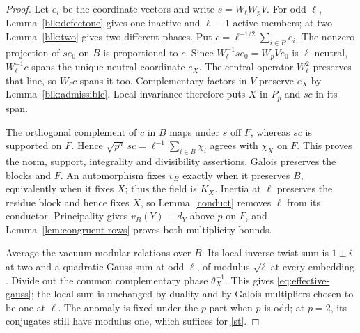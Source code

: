\documentclass[11pt]{amsart}
\numberwithin{equation}{section}
\theoremstyle{definition}
\theoremstyle{plain}
\begin{document}
\begin{proof}
Let $e_i$ be the coordinate vectors and write $s=W_\ell W_pV$.
For odd $\ell$, Lemma~\ref{blk:defectone} gives one inactive and
$\ell-1$ active members; at two Lemma~\ref{blk:two} gives two
different phases. Put $c=\ell^{-1/2}\sum_{i\in B}e_i$.
The nonzero projection of $se_0$ on $B$ is proportional to $c$.
Since $W_\ell^{-1}se_0=W_pVe_0$ is $\ell$-neutral,
$W_\ell^{-1}c$ spans the unique neutral coordinate $e_X$.
The central operator $W_\ell^2$ preserves that line, so
$W_\ell c$ spans it too. Complementary factors in $V$ preserve
$e_X$ by Lemma~\ref{blk:admissible}. Local invariance therefore
puts $X$ in $P_p$ and $sc$ in its span.

The orthogonal complement of $c$ in $B$ maps under $s$ off $F$,
whereas $sc$ is supported on $F$. Hence
$\sqrt{p^a}\,sc=\ell^{-1}\sum_{i\in B}\chi_i$ agrees with
$\chi_X$ on $F$. This proves the norm, support, integrality and
divisibility assertions. Galois preserves the blocks and $F$.
An automorphism fixes $v_B$ exactly when it preserves $B$,
equivalently when it fixes $X$; thus the field is $K_X$.
Inertia at $\ell$ preserves the residue block and hence fixes $X$,
so Lemma~\ref{conduct} removes $\ell$ from its conductor.
Principality gives $v_B(Y)\equiv d_Y$ above $p$ on $F$,
and Lemma~\ref{lem:congruent-rows} proves both multiplicity bounds.

Average the vacuum modular relations over $B$. Its local inverse
twist sum is $1\pm i$ at two and a quadratic Gauss sum at odd
$\ell$, of modulus $\sqrt\ell$ at every embedding
\cite[Ch.~6]{Washington}. Divide out the common complementary
phase $\theta_X^{-1}$. This gives \eqref{eq:effective-gauss};
the local sum is unchanged by duality and by Galois multipliers
chosen to be one at $\ell$. The anomaly is fixed under the
$p$-part when $p$ is odd; at $p=2$, its conjugates still have
modulus one, which suffices for \eqref{st}.
\end{proof}
\end{document}

